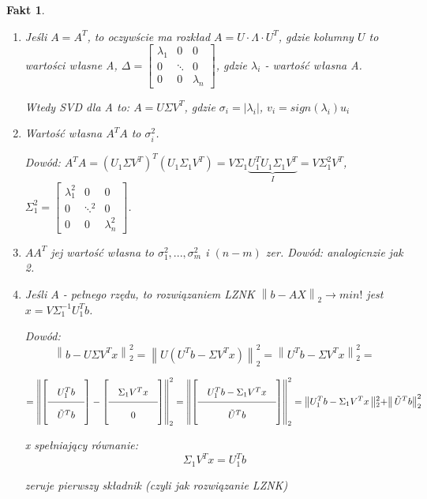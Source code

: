 \documentclass[hidelinks,a4paper,fleqn]{article}
\newcommand{\ra}{\rightarrow}
\newcommand{\norm}[1]{\left\lVert#1\right\rVert}
\newtheorem{fakt}{Fakt}
\begin{document}
\begin{fakt} $\ $ %
	\begin{enumerate}
		\item Jeśli $A=A^T$, to oczywście ma rozkład $A = U \cdot \Lambda \cdot U^T$, gdzie kolumny $U$ to wartości własne A, $\Delta = \begin{bmatrix}
		      \lambda_1 & 0 & 0\\ 
		      0 & \ddots & 0\\ 
		      0 & 0 & \lambda_n 
		\end{bmatrix}$, gdzie $\lambda_i$ - wartość własna A.
		
		Wtedy SVD dla A to:
		$A = U\Sigma V^T$, gdzie $\sigma_i = |\lambda_i|$, $v_i = sign(\lambda_i)u_i$
		 			
		\item Wartość własna $A^TA$ to $\sigma_i^2$.
		       			
		      Dowód: $A^TA = (U_1\Sigma V^T)^T(U_1 \Sigma_1 V^T) = V \Sigma_1 \underbrace{U_1^T U_1 \Sigma_1 V^T}_{I} = V \Sigma_1^2V^T$, $\Sigma_1^2 = \begin{bmatrix}
		      \lambda_1^2 & 0 & 0\\ 
		      0 & \ddots^2 & 0\\ 
		      0 & 0 & \lambda_n^2 
		\end{bmatrix}$.
				
		\item $AA^T$ jej wartość własna to $\sigma_1^2, ..., \sigma_m^2$ i $(n-m)$ zer.
		      Dowód: analogicnzie jak 2.
		      		
		\item Jeśli $A$ - pełnego rzędu, to rozwiązaniem LZNK $\norm{b - AX}_2 \ra min!$ jest $x = V\Sigma_1^{-1} U_1^Tb$.
		      		
		      Dowód:
		      \[
		      	\norm{b - U\Sigma V^Tx} _2 ^2 = \norm{U(U^Tb - \Sigma V^Tx)}_2^2 = \norm{U^Tb - \Sigma V^Tx}_2^2 =
		      	\]
		      	
		      	\[\arraycolsep=1em\def\arraystretch{2} = \norm{\left[\begin{array}{c}
		      	U_1^Tb\\ 
		      	\hline
		      	\tilde{U}^Tb
		      	\end{array}\right] - \left[\begin{array}{c}\Sigma_1V^Tx\\ \hline 0 \end{array}\right]}_2^2 = \norm{\left[\begin{array}{c}U_1^Tb - \Sigma_1V^Tx\\ \hline \tilde{U}^Tb \end{array}\right]}_2^2 =\norm{U_1^Tb - \Sigma_1V^Tx\norm{_2^2 +} \tilde{U}^Tb}_2^2
		      \]
		      
		      x spełniający równanie:
		      \[
		      	\Sigma_1V^Tx = U_1^Tb
		      \]
		      
		      zeruje pierwszy składnik (czyli jak rozwiązanie LZNK)
	\end{enumerate}
\end{fakt}
\end{document}
